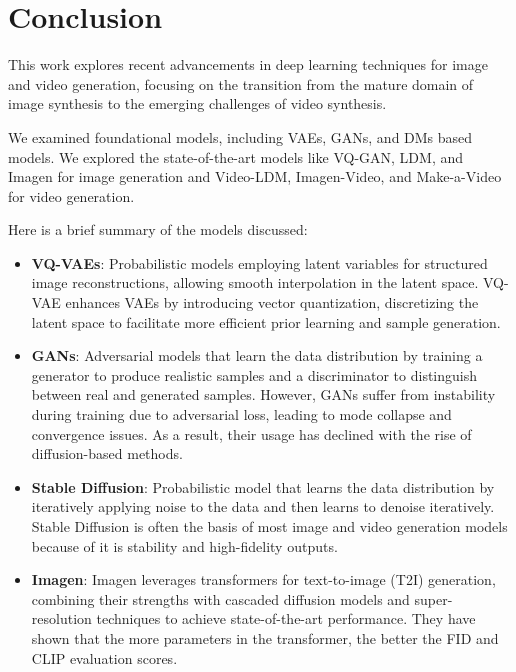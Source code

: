 \section{Conclusion}

This work explores recent advancements in deep learning techniques for image and video generation, focusing on the transition from the mature domain of image synthesis to the emerging challenges of video synthesis.

We examined foundational models, including VAEs, GANs, and DMs based models. We explored the state-of-the-art models like VQ-GAN, LDM, and Imagen for image generation and Video-LDM, Imagen-Video, and Make-a-Video for video generation.

Here is a brief summary of the models discussed:

\begin{itemize}
    \item \textbf{VQ-VAEs}: Probabilistic models employing latent variables for structured image reconstructions, allowing smooth interpolation in the latent space. VQ-VAE enhances VAEs by introducing vector quantization, discretizing the latent space to facilitate more efficient prior learning and sample generation.
    
    \item \textbf{GANs}: Adversarial models that learn the data distribution by training a generator to produce realistic samples and a discriminator to distinguish between real and generated samples. However, GANs suffer from instability during training due to adversarial loss, leading to mode collapse and convergence issues. As a result, their usage has declined with the rise of diffusion-based methods.
    
    \item \textbf{Stable Diffusion}: Probabilistic model that learns the data distribution by iteratively applying noise to the data and then learns to denoise iteratively. Stable Diffusion is often the basis of most image and video generation models because of it is stability and high-fidelity outputs.
    
    \item \textbf{Imagen}: Imagen leverages transformers for text-to-image (T2I) generation, combining their strengths with cascaded diffusion models and super-resolution techniques to achieve state-of-the-art performance. They have shown that the more parameters in the transformer, the better the FID and CLIP evaluation scores.
\end{itemize}

